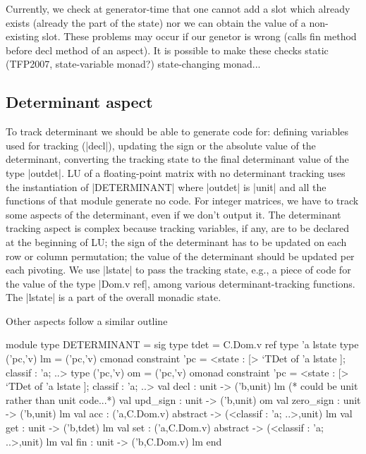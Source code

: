 \documentclass[draft]{elsart}
\begin{document}
Currently, we check at generator-time that one cannot add a slot which
already exists (already the part of the state) nor we can obtain the
value of a non-existing slot. These problems may occur if our genetor
is wrong (calls fin method before decl method of an aspect). It is
possible to make these checks static (TFP2007, state-variable monad?)
state-changing monad...




\subsection{Determinant aspect}

To track determinant we should be able to generate code
for: defining variables used for tracking (|decl|),
updating the sign or the absolute
value of the determinant, converting the tracking state
to the final determinant value of the type |outdet|. LU of a
floating-point matrix with no determinant tracking uses the
instantiation of |DETERMINANT| where |outdet| is |unit| and all the
functions of that module generate no code. For integer matrices, we
have to track some aspects of the determinant, even if we don't output
it. The determinant tracking aspect is complex because tracking
variables, if any, are to be declared at the beginning of LU; the sign
of the determinant has to be updated on each row or column
permutation; the value of the determinant should be updated per each
pivoting. We use |lstate| to pass the tracking state, e.g., a piece of
code for the value of the type |Dom.v ref|, among
various determinant-tracking functions. The |lstate| is a part of the
overall monadic state. 

Other aspects follow a similar outline

\begin{code}
module type DETERMINANT = sig
  type tdet = C.Dom.v ref
  type 'a lstate
  type ('pc,'v) lm = ('pc,'v) cmonad
    constraint 'pc = <state : [> `TDet of 'a lstate ]; classif : 'a; ..>
  type ('pc,'v) om = ('pc,'v) omonad
    constraint 'pc = <state : [> `TDet of 'a lstate ]; classif : 'a; ..>
  val decl : unit -> ('b,unit) lm (* could be unit rather than unit code...*)
  val upd_sign  : unit -> ('b,unit) om
  val zero_sign : unit -> ('b,unit) lm
  val acc       : ('a,C.Dom.v) abstract -> (<classif : 'a; ..>,unit) lm
  val get       : unit -> ('b,tdet) lm
  val set       : ('a,C.Dom.v) abstract -> (<classif : 'a; ..>,unit) lm
  val fin       : unit -> ('b,C.Dom.v) lm
end
\end{code}
\end{document}

